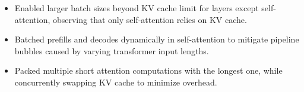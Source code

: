 


\begin{itemize}[nosep]
  \item Enabled larger batch sizes beyond KV cache limit for layers except self-attention, observing that only self-attention relies on KV cache.
  \item Batched prefills and decodes dynamically in self-attention to mitigate pipeline bubbles caused by varying transformer input lengths.
  \item Packed multiple short attention computations with the longest one, while concurrently swapping KV cache to minimize overhead.
\end{itemize}
